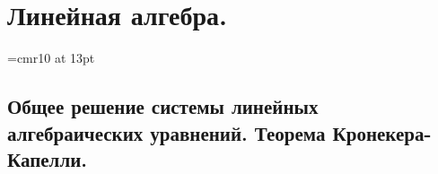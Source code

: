 \part[Линейная алгебра.]{Линейная алгебра.}%

\font\Large=cmr10 at 13pt
\newcount\rowcount{}
\def\fudge#1{\smash{\hbox{\Large#1}}}
\def\doublyso{\kern+2em\smash{\vrule height \rowcount em depth .2em}\hidewidth}			%
\chapter{Общее решение системы линейных алгебраических уравнений. Теорема Кронекера-Капелли.}
